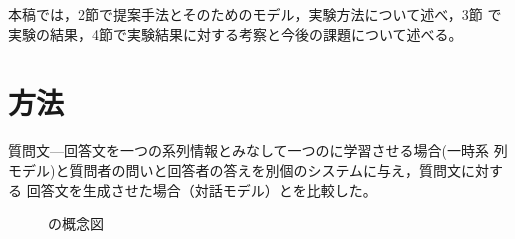 \documentclass[twocolumn]{jarticle}
\begin{document}
本稿では，2節で提案手法とそのための\LSTM モデル，実験方法について述べ，3節
で実験の結果，4節で実験結果に対する考察と今後の課題について述べる。

\section{方法}
質問文---回答文を一つの系列情報とみなして一つの\RNN に学習させる場合(一時系
列モデル)と質問者の問いと回答者の答えを別個のシステムに与え，質問文に対する
回答文を生成させた場合（対話モデル）とを比較した。

\begin{figure}[h]
\centering
{}
\caption{\LSTM の概念図}\label{fig:LSTM}
\end{figure}



\end{document}
